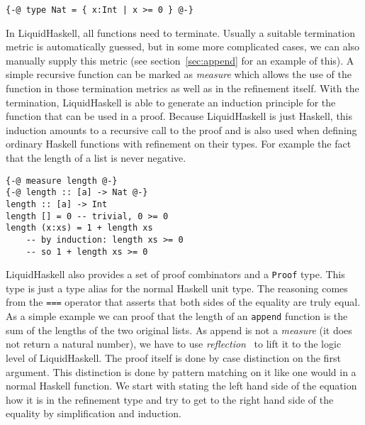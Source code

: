 \documentclass[sigplan,screen]{acmart}
\begin{document}
\begin{lstlisting}
{-@ type Nat = { x:Int | x >= 0 } @-}
\end{lstlisting}

In LiquidHaskell, all functions need to terminate. Usually a suitable termination metric is automatically guessed, but in some more complicated cases, we can also manually supply this metric (see section~\ref{sec:append} for an example of this). A simple recursive function can be marked as \textit{measure} which allows the use of the function in those termination metrics as well as in the refinement itself. With the termination, LiquidHaskell is able to generate an induction principle for the function that can be used in a proof. Because LiquidHaskell is just Haskell, this induction amounts to a recursive call to the proof and is also used when defining ordinary Haskell functions with refinement on their types. For example the fact that the length of a list is never negative.

\begin{lstlisting}
{-@ measure length @-}
{-@ length :: [a] -> Nat @-}
length :: [a] -> Int
length [] = 0 -- trivial, 0 >= 0
length (x:xs) = 1 + length xs
    -- by induction: length xs >= 0
    -- so 1 + length xs >= 0
\end{lstlisting}

LiquidHaskell also provides a set of proof combinators and a \texttt{Proof} type. This type is just a type alias for the normal Haskell unit type. The reasoning comes from the \texttt{===} operator that asserts that both sides of the equality are truly equal. As a simple example we can proof that the length of an \texttt{append} function is the sum of the lengths of the two original lists. As append is not a \textit{measure} (it does not return a natural number), we have to use \textit{reflection}~\cite{reflection} to lift it to the logic level of LiquidHaskell. The proof itself is done by case distinction on the first argument. This distinction is done by pattern matching on it like one would in a normal Haskell function. We start with stating the left hand side of the equation how it is in the refinement type and try to get to the right hand side of the equality by simplification and induction.
\end{document}
